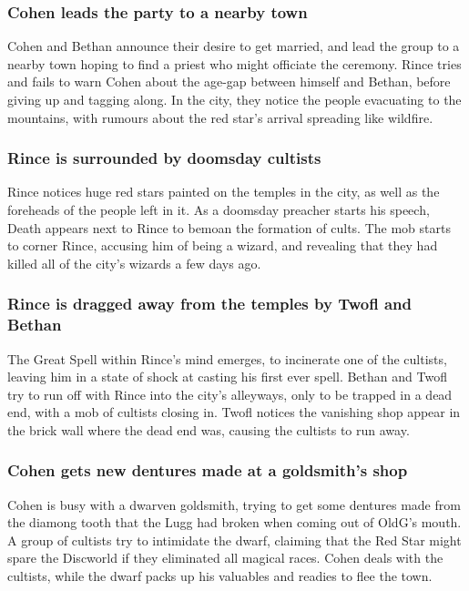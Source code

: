 \subsubsection{\Gls{Cohen} leads the party to a nearby town}
\Gls{Cohen} and \Gls{Bethan} announce their desire to get married, and lead the group to a nearby
town hoping to find a priest who might officiate the ceremony. \Gls{Rince} tries and fails to warn
\Gls{Cohen} about the age-gap between himself and \Gls{Bethan}, before giving up and tagging along.
In the city, they notice the people evacuating to the mountains, with rumours about the red star's
arrival spreading like wildfire.

\subsubsection{\Gls{Rince} is surrounded by doomsday cultists}
\Gls{Rince} notices huge red stars painted on the temples in the city, as well as the foreheads of
the people left in it. As a doomsday preacher starts his speech, \Gls{Death} appears next to
\Gls{Rince} to bemoan the formation of cults. The mob starts to corner \Gls{Rince}, accusing him of
being a wizard, and revealing that they had killed all of the city's wizards a few days ago.

\subsubsection{\Gls{Rince} is dragged away from the temples by \Gls{Twofl} and \Gls{Bethan}}
The Great Spell within \Gls{Rince}'s mind emerges, to incinerate one of the cultists, leaving him
in a state of shock at casting his first ever spell. \Gls{Bethan} and \Gls{Twofl} try to run off
with \Gls{Rince} into the city's alleyways, only to be trapped in a dead end, with a mob of
cultists closing in. \Gls{Twofl} notices the vanishing shop appear in the brick wall where the
dead end was, causing the cultists to run away.

\subsubsection{\Gls{Cohen} gets new dentures made at a goldsmith's shop}
\Gls{Cohen} is busy with a dwarven goldsmith, trying to get some dentures made from the diamong
tooth that the \Gls{Lugg} had broken when coming out of \Gls{OldG}'s mouth. A group of cultists try
to intimidate the dwarf, claiming that the Red Star might spare the Discworld if they eliminated all
magical races. \Gls{Cohen} deals with the cultists, while the dwarf packs up his valuables and
readies to flee the town.

